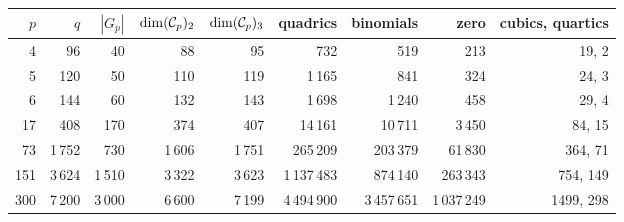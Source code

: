 \begin{tabular}{@{}rrrrrrrrr@{}}
\toprule
$p$ & $q$ & $|G_p|$ & $\dim(\mathcal{C}_p)_2$ & $\dim(\mathcal{C}_p)_3$ & quadrics & binomials & zero & cubics, quartics\\
\midrule
4 & 96 & 40 & 88 & 95 & 732 & 519 & 213 & 19, 2\\
5 & 120 & 50 & 110 & 119 & 1\,165 & 841 & 324 & 24, 3\\
6 & 144 & 60 & 132 & 143 & 1\,698 & 1\,240 & 458 & 29, 4\\
17 & 408 & 170 & 374 & 407 & 14\,161 & 10\,711 & 3\,450 & 84, 15\\
73 & 1\,752 & 730 & 1\,606 & 1\,751 & 265\,209 & 203\,379 & 61\,830 & 364, 71\\
151 & 3\,624 & 1\,510 & 3\,322 & 3\,623 & 1\,137\,483 & 874\,140 & 263\,343 & 754, 149\\
300 & 7\,200 & 3\,000 & 6\,600 & 7\,199 & 4\,494\,900 & 3\,457\,651 & 1\,037\,249 & 1499, 298\\
\bottomrule
\end{tabular}
